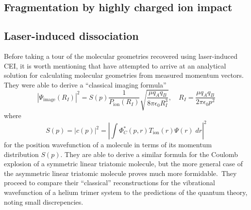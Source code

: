 \subsection{Fragmentation by highly charged ion impact}

\subsection{Laser-induced dissociation}

Before taking a tour of the molecular geometries recovered using laser-induced CEI, it is worth mentioning that \citet{Nagaya04} have attempted to arrive at an analytical solution for calculating molecular geometries from measured momentum vectors. They were able to derive a ``classical imaging formula''
\begin{equation}
|\Psi_\mathrm{image}(R_I)|^2 = S(p) \frac{1}{P_\mathrm{ion}(R_I)} \sqrt{\frac{\mu q_A q_B}{8\pi\epsilon_0 R_I^3}} , \quad R_I = \frac{\mu q_A q_B}{2\pi\epsilon_0 p^2}
\end{equation}
where
\begin{equation}
S(p) = |c(p)|^2 = \left| \int \Phi_C^*(p,r) T_\mathrm{ion}(r) \Psi(r) \; dr  \right|^2
\end{equation}
for the position wavefunction of a molecule in terms of its momentum distribution $S(p)$. They are able to derive a similar formula for the Coulomb explosion of a symmetric linear triatomic molecule, but the more general case of the asymmetric linear triatomic molecule proves much more formidable.\footnotemark ~They proceed to compare their ``classical'' reconstructions for the vibrational wavefunction of a helium trimer system to the predictions of the quantum theory, noting small discrepencies.



